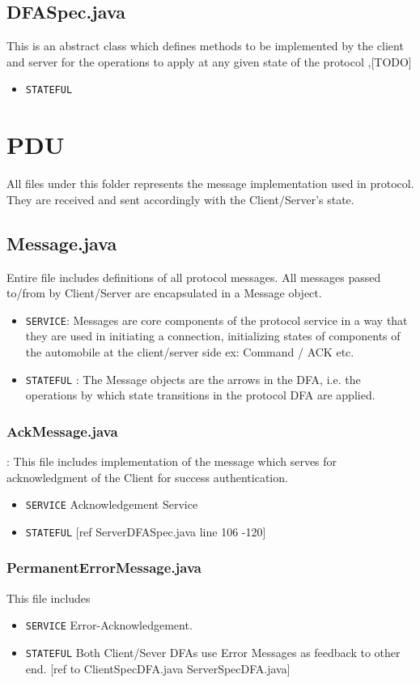 \documentclass[12pt]{usenixsubmit}
\begin{document}
\subsection{DFASpec.java}This is an abstract class which defines methods to be implemented by the client and server for the operations to apply at any given state of the protocol ,[TODO]
\begin{itemize}
  \item {\tt STATEFUL}
\end{itemize}

  \section{PDU} All files under this folder represents the message implementation used in protocol. They are received and sent accordingly with the Client/Server's state.

     \subsection{Message.java} Entire file includes definitions of all protocol messages. All messages passed to/from by Client/Server are encapsulated in a Message object.
     \begin{itemize}
     \item {\tt SERVICE}:  Messages are core components of the protocol service in a way that they are used in initiating a connection, initializing states of components of the automobile at the client/server side ex: Command / ACK  etc.
     \item {\tt STATEFUL} : The Message objects are the arrows in the DFA, i.e. the operations by which state transitions in the protocol DFA are applied.
     \end{itemize}
\subsubsection{AckMessage.java}: This file includes implementation of the message which serves for acknowledgment of the Client for success authentication.
     \begin{itemize}
     \item {\tt SERVICE} Acknowledgement Service
     \item {\tt STATEFUL} [ref ServerDFASpec.java line 106 -120]
     \end{itemize}

     \subsubsection{PermanentErrorMessage.java}This file includes 
     \begin{itemize}
     \item {\tt SERVICE}  Error-Acknowledgement.
     \item {\tt STATEFUL} Both Client/Sever DFAs use Error Messages as feedback to other end. [ref to ClientSpecDFA.java ServerSpecDFA.java]
     \end{itemize}
\end{document}
